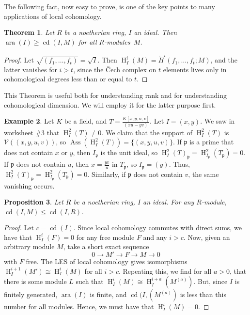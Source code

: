 \documentclass[11pt]{book}
\newtheorem{theorem}{Theorem}[chapter]
\newtheorem{proposition}[theorem]{Proposition}
\numberwithin{equation}{section}
\numberwithin{theorem}{chapter}
\theoremstyle{definition}
\newtheorem{example}[theorem]{Example}
\newtheorem*{basic properties}{Basic Properties}
\newtheorem*{Important Remark}{Important Remark}
\theoremstyle{remark}
\newcommand{\V}{\mathcal{V}}
\newcommand{\p}{\mathfrak{p}}
\newcommand{\ara}{\operatorname{ara}}
\newcommand{\Ass}{\operatorname{Ass}}
\DeclareMathOperator{\cd}{cd}
\renewcommand{\H}{\operatorname{H}}
\begin{document}
The following fact, now easy to prove, is one of the key points to many applications of local cohomology. 

\begin{theorem}\label{theorem:cd-ara} Let $R$ be a noetherian ring, $I$ an ideal. Then
	$\ara(I) \geq \cd(I,M)$  for all $R$-modules~$M$.
\end{theorem}
\begin{proof}
	Let $\sqrt{(f_1,\dots, f_t)}=\sqrt{I}$. Then $\H^i_I(M)=\check{H}^i(f_1,\dots, f_t;M)$, and the latter vanishes for $i>t$, since the \v{C}ech complex on $t$ elements lives only in cohomological degrees less than or equal to $t$.
\end{proof}

This Theorem is useful both for understanding rank and for understanding cohomological dimension. We will employ it for the latter purpose first.

\begin{example}
	Let $K$ be a field, and $\displaystyle T=\frac{K[x,y,u,v]}{(xu-yv)}$. Let $I=(x,y)$. We saw in worksheet \#3 that $\H^2_I(T)\neq 0$. We claim that the support of $\H^2_I(T)$ is $\V((x,y,u,v))$, so $\Ass(\H^2_I(T))=\{(x,y,u,v)\}$. If $\p$ is a prime that does not contain $x$ or $y$, then $I_\p$ is the unit ideal, so $\H^2_I(T)_\p=\H^2_{I_\p}(T_\p)=0$. If $\p$ does not contain $u$, then $x=\frac{yv}{u}$ in $T_\p$, so $I_\p=(y)$. Thus, $\H^2_I(T)_\p=\H^2_{I_\p}(T_\p)=0$. Similarly, if $\p$ does not contain $v$, the same vanishing occurs.
\end{example}

\begin{proposition}
	Let $R$ be a noetherian ring, $I$ an ideal. For any $R$-module,
	$\cd(I,M)\leq \cd(I,R)$.
\end{proposition}
\begin{proof}
	Let $c=\cd(I)$. Since local cohomology commutes with direct sums, we have that $\H^i_I(F)=0$ for any free module $F$ and any $i>c$. Now, given an arbitrary module $M$, take a short exact sequence
	\[ 0\to M' \to F \to M \to 0 \]
	with $F$ free. The LES of local cohomology gives isomorphisms
 $\H^{i+1}_I(M')\cong \H^{i}_I(M)$ for all $i>c$. Repeating this, we find for all $a>0$, that there is some module $L$ such that $\H^i_I(M)\cong \H^{i+a}_I(M^{(a)})$. But, since $I$ is finitely generated, $\ara(I)$ is finite, and $\cd(I,(M^{(a)})$ is less than this number for all modules. Hence, we must have that $\H^i_I(M)=0$.
\end{proof}
\end{document}
